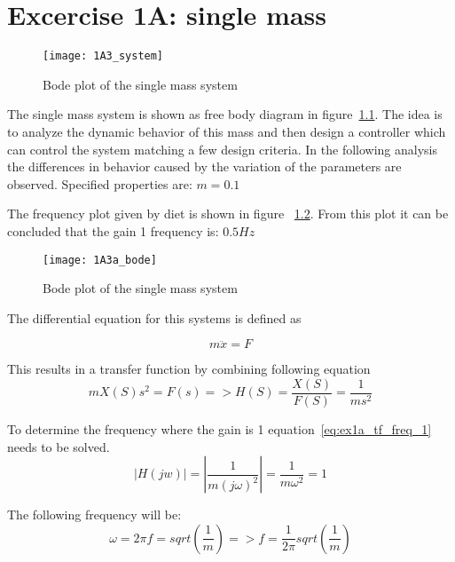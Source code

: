 \documentclass[report.tex]{subfiles}
\begin{document}
\chapter{Excercise 1A: single mass}

\begin{figure}[H]
  \centering
\texttt{[image: 1A3\_system]}
\caption{Bode plot of the single mass system}
\label{fig:1A3_system}
\end{figure}

The single mass system is shown as free body diagram in figure~\ref{fig:1A3_system}. The idea is to analyze the dynamic behavior of this mass and then design a controller which can control the system matching a few design criteria. In the following analysis the differences in behavior caused by the variation of the parameters are observed. Specified properties are: 
$ m = 0.1 $

The frequency plot given by diet is shown in figure ~\ref{fig:1A3a_bode}.
From this plot it can be concluded that the gain 1 frequency is: $0.5Hz$

\begin{figure}[H]
  \centering
\texttt{[image: 1A3a\_bode]}
\caption{Bode plot of the single mass system}
\label{fig:1A3a_bode}
\end{figure}


The differential equation for this systems is defined as

\begin{equation}
\label{eq:ex1a_diff}
m\ddot{x} = F
\end{equation}

This results in a transfer function by combining following equation
\begin{equation}
\label{eq:ex1a_tf_mass_2}
mX(S)s^2 = F(s) => H(S) = \frac{X(S)}{F(S)} = \frac{1}{ms^2}
\end{equation}

To determine the frequency where the gain is 1 equation~\ref{eq:ex1a_tf_freq_1} needs to be solved. 
\begin{equation}
\label{eq:ex1a_tf_freq_1}
|H(jw)| = |\frac{1}{m(j\omega)^2}| = \frac{1}{m\omega^2} = 1
\end{equation}

The following frequency will be:
\begin{equation}
\label{eq:ex1a_tf_freq_2}
\omega = 2\pi f = sqrt(\frac{1}{m}) => f = \frac{1}{2\pi}sqrt(\frac{1}{m}) 
\end{equation}
\end{document}
